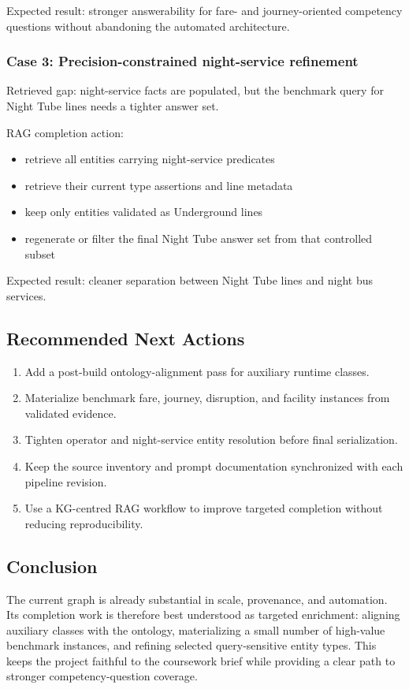 \documentclass[
  11pt,
  a4paper,
]{article}
\providecommand{\tightlist}{%
  \setlength{\itemsep}{0pt}\setlength{\parskip}{0pt}}
\begin{document}
Expected result: stronger answerability for fare- and journey-oriented
competency questions without abandoning the automated architecture.

\subsubsection{Case 3: Precision-constrained night-service
refinement}\label{case-3-precision-constrained-night-service-refinement}

Retrieved gap: night-service facts are populated, but the benchmark
query for Night Tube lines needs a tighter answer set.

RAG completion action:

\begin{itemize}
\tightlist
\item
  retrieve all entities carrying night-service predicates
\item
  retrieve their current type assertions and line metadata
\item
  keep only entities validated as Underground lines
\item
  regenerate or filter the final Night Tube answer set from that
  controlled subset
\end{itemize}

Expected result: cleaner separation between Night Tube lines and night
bus services.

\subsection{Recommended Next Actions}\label{recommended-next-actions}

\begin{enumerate}
\def\labelenumi{\arabic{enumi}.}
\tightlist
\item
  Add a post-build ontology-alignment pass for auxiliary runtime
  classes.
\item
  Materialize benchmark fare, journey, disruption, and facility
  instances from validated evidence.
\item
  Tighten operator and night-service entity resolution before final
  serialization.
\item
  Keep the source inventory and prompt documentation synchronized with
  each pipeline revision.
\item
  Use a KG-centred RAG workflow to improve targeted completion without
  reducing reproducibility.
\end{enumerate}

\subsection{Conclusion}\label{conclusion}

The current graph is already substantial in scale, provenance, and
automation. Its completion work is therefore best understood as targeted
enrichment: aligning auxiliary classes with the ontology, materializing
a small number of high-value benchmark instances, and refining selected
query-sensitive entity types. This keeps the project faithful to the
coursework brief while providing a clear path to stronger
competency-question coverage.
\end{document}
